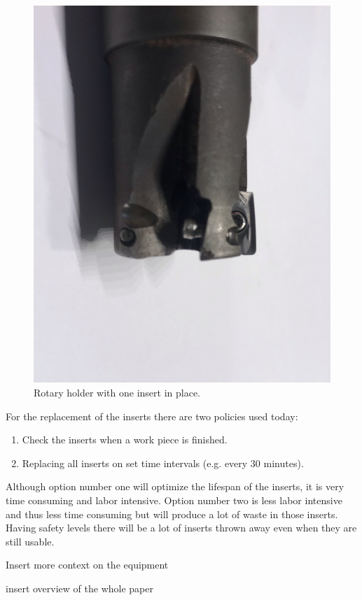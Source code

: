 \begin{figure}[hbtp]
\centering
\includegraphics[scale=0.1]{fig/algemeen/plaatjes/houder/rotary_holder.jpeg}
\caption{Rotary holder with one insert in place.}
 \label{fig:gen:insertholder}
\end{figure}


   
    
    For the replacement of the inserts there are two policies used today:
    \begin{enumerate}
        \item Check the inserts when a work piece is finished.
        \item Replacing all inserts on set time intervals (e.g. every 30 minutes).
    \end{enumerate}
     Although option number one will optimize the lifespan of the inserts, it is very time consuming and labor intensive. Option number two is less labor intensive and thus less time consuming but will produce a lot of waste in those inserts. Having safety levels there will be a lot of inserts thrown away even when they are still usable.
     
     Insert more context on the equipment
     
insert overview of the whole paper